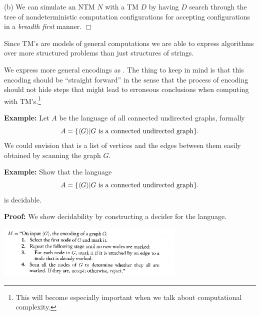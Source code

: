 \documentclass[a4paper,blends,pdf,colorBG,slideColor]{prosper}
\begin{document}
(b) We can simulate an NTM $N$ with a TM $D$ by having $D$ search through the
tree of nondeterministic computation configurations for accepting configurations
in a {\em breadth first} manner.
$\Box$



\es

Since TM's are models of general computations we are able to express  algorithms
over more structured problems than just structures of strings.

We express more general encodings as .
The thing to keep in mind is that this encoding should be ``straight forward'' in the
sense that the process of encoding should not hide steps that might lead
to erroneous conclusions when computing with TM's.\footnote{This will become especially important when we talk about computational complexity.}

{\bf Example:} Let $A$ be the language of all connected undirected graphs, formally
\[
A = \{ \langle {G} \rangle | \mbox{$G$  is a connected undirected graph}\}.
\]
We could envision that  is a list of vertices and the edges between them
easily obtained by scanning the graph $G$.
\vspace{.2in}
\es

{\bf Example:} Show that the language
\[
A = \{ \langle {G} \rangle | \mbox{$G$  is a connected undirected graph}\}.
\]
is decidable.

{\bf Proof:} We show decidability by constructing a decider for the language.
\begin{center}
\includegraphics[height=25mm]{images/graph-decider.eps}
\end{center}

\es
\end{document}
